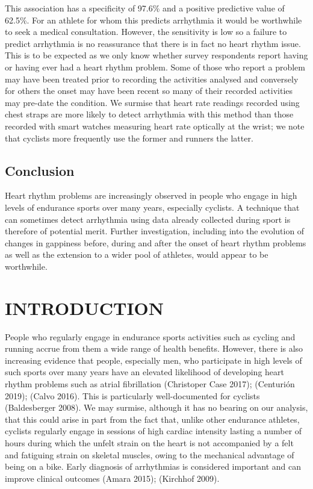 \documentclass[
  letterpaper,
  DIV=11,
  numbers=noendperiod]{scrartcl}
\begin{document}
This association has a specificity of 97.6\% and a positive predictive
value of 62.5\%. For an athlete for whom this predicts arrhythmia it
would be worthwhile to seek a medical consultation. However, the
sensitivity is low so a failure to predict arrhythmia is no reassurance
that there is in fact no heart rhythm issue. This is to be expected as
we only know whether survey respondents report having or having ever had
a heart rhythm problem. Some of those who report a problem may have been
treated prior to recording the activities analysed and conversely for
others the onset may have been recent so many of their recorded
activities may pre-date the condition. We surmise that heart rate
readings recorded using chest straps are more likely to detect
arrhythmia with this method than those recorded with smart watches
measuring heart rate optically at the wrist; we note that cyclists more
frequently use the former and runners the latter.

\subsection{Conclusion}\label{conclusion}

Heart rhythm problems are increasingly observed in people who engage in
high levels of endurance sports over many years, especially cyclists. A
technique that can sometimes detect arrhythmia using data already
collected during sport is therefore of potential merit. Further
investigation, including into the evolution of changes in gappiness
before, during and after the onset of heart rhythm problems as well as
the extension to a wider pool of athletes, would appear to be
worthwhile.

\section{INTRODUCTION}\label{introduction-1}

People who regularly engage in endurance sports activities such as
cycling and running accrue from them a wide range of health benefits.
However, there is also increasing evidence that people, especially men,
who participate in high levels of such sports over many years have an
elevated likelihood of developing heart rhythm problems such as atrial
fibrillation (Christoper Case 2017); (Centurión 2019); (Calvo 2016).
This is particularly well-documented for cyclists (Baldesberger 2008).
We may surmise, although it has no bearing on our analysis, that this
could arise in part from the fact that, unlike other endurance athletes,
cyclists regularly engage in sessions of high cardiac intensity lasting
a number of hours during which the unfelt strain on the heart is not
accompanied by a felt and fatiguing strain on skeletal muscles, owing to
the mechanical advantage of being on a bike. Early diagnosis of
arrhythmias is considered important and can improve clinical outcomes
(Amara 2015); (Kirchhof 2009).
\end{document}
